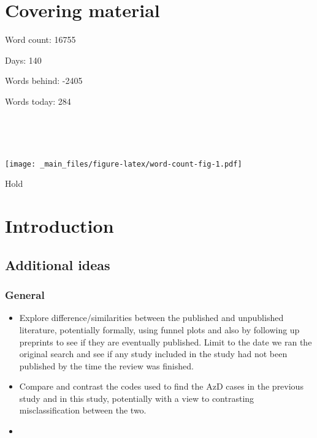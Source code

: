 \documentclass[a4paper, twoside]{templates/ociamthesis}
\begin{document}
\flushbottom

\hypertarget{covering-material}{%
\chapter*{Covering material}\label{covering-material}}

\adjustmtc

Word count: 16755

Days: 140

Words behind: -2405

Words today: 284

~

~

\texttt{[image: \_main\_files/figure-latex/word-count-fig-1.pdf]}

\begin{savequote}
Hold
\end{savequote}



\hypertarget{intro-heading}{%
\chapter{Introduction}\label{intro-heading}}

\minitoc 

\hypertarget{additional-ideas}{%
\section{Additional ideas}\label{additional-ideas}}

\hypertarget{general}{%
\subsection{General}\label{general}}

\begin{itemize}
\item
  Explore difference/similarities between the published and unpublished literature, potentially formally, using funnel plots and also by following up preprints to see if they are eventually published. Limit to the date we ran the original search and see if any study included in the study had not been published by the time the review was finished.
\item
  Compare and contrast the codes used to find the AzD cases in the previous study and in this study, potentially with a view to contrasting misclassification between the two.
\item
\end{itemize}
\end{document}
